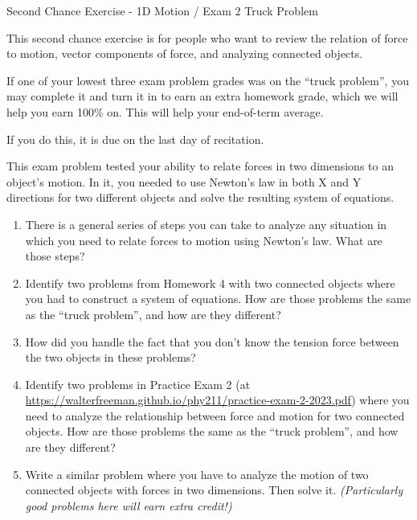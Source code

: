 \documentclass[12pt]{article}
\begin{document}
\begin{center}
\Large
\sc Second Chance Exercise - 1D Motion / Exam 2 Truck Problem \rm





\normalsize
This second chance exercise is for people who want to review the relation of force to motion, vector components of force, and analyzing connected objects.

If one of your lowest three exam problem grades was on the ``truck problem'', you may complete it and turn it in to earn an extra homework grade, which we will help you earn 100\% on. This will help your end-of-term average.

If you do this, it is due on the last day of recitation.

\end{center}

\vspace{1.5in}

This exam problem tested your ability to relate forces in two dimensions to an object's motion. In it, you needed to use Newton's law in both X and Y directions for two different objects and solve the resulting system of equations.

\begin{enumerate}
	
		\item There is a general series of steps you can take to analyze any situation in which you need to relate forces to motion using Newton's law. What are those steps?
	
		\item Identify two problems from Homework 4 with two connected objects where you had to construct a system of equations. How are those problems the same as the ``truck problem'', and how are they different?
		
	\item How did you handle the fact that you don't know the tension force between the two objects in these problems?

	\item Identify two problems in Practice Exam 2 (at \url{https://walterfreeman.github.io/phy211/practice-exam-2-2023.pdf}) where you need to analyze the relationship between force and motion for two connected objects. How are those problems the same as the ``truck problem'', and how are they different?
	

	
    \item Write a similar problem where you have to analyze the motion of two connected objects with forces in two dimensions. Then solve it. {\it (Particularly good problems here will earn extra credit!)}
\end{enumerate}
\end{document}
